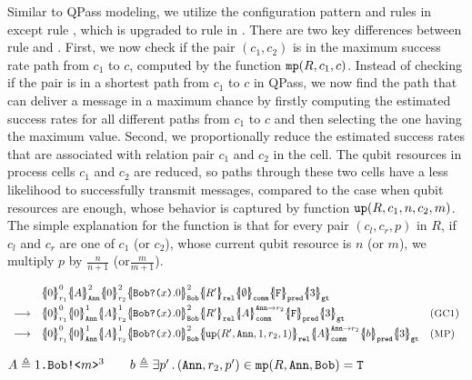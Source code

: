 Similar to QPass modeling, we utilize the configuration pattern and rules in  except rule ,
which is upgraded to rule  in .
There are two key differences between rule  and .
First, we now check if the pair $(c_1,c_2)$ is in the maximum success rate path from $c_1$ to $c$, computed by the function $\texttt{mp}(R,c_1,c)$. Instead of checking if the pair is in a shortest path from $c_1$ to $c$ in QPass, we now find the path that can deliver a message in a maximum chance by firstly computing the estimated success rates for all different paths from $c_1$ to $c$ and then selecting the one having the maximum value. Second, we proportionally reduce the estimated success rates that are associated with relation pair $c_1$ and $c_2$ in the  cell. The qubit resources in process cells $c_1$ and $c_2$ are reduced, so paths through these two cells have a less likelihood to successfully transmit messages, compared to the case when qubit resources are enough,
whose behavior is captured by function $\texttt{up}(R,c_1,n,c_2,m)$.
The simple explanation for the  function is that
for every pair $(c_l,c_r,p)$ in $R$, if $c_l$ and $c_r$ are one of $c_1$ (or $c_2$), whose current qubit resource is $n$ (or $m$), we multiply $p$ by $\frac{n}{n+1}$ (or$ \frac{m}{m+1}$). 

{\footnotesize
\begin{center}
\[
\begin{array}{lll}
&
\pcellb{0}{0}{r_1}
\pcellb{A}{2}{\cn{Ann}}
\pcellb{0}{2}{r_2}
\pcellb{\qrev{\cn{Bob}}{x}.0}{2}{\cn{Bob}}
\qcellb{R'}{\cn{rel}}
\qcellb{\emptyset}{\cn{comm}}
\qcellb{\cn{F}}{\cn{pred}}
\qcellb{3}{\cn{gt}}
\\[0.5em]
\longrightarrow
&
\pcellb{0}{0}{r_1}
\pcellb{0}{1}{\cn{Ann}}
\pcellb{A}{1}{r_2}
\pcellb{\qrev{\cn{Bob}}{x}.0}{2}{\cn{Bob}}
\qcellb{R'}{\cn{rel}}
\pcellb{A}{\cn{Ann}\rightarrow r_2}{\cn{comm}}
\qcellb{\cn{F}}{\cn{pred}}
\qcellb{3}{\cn{gt}}
&
(\rulelab{GC1})
\\[0.5em]
\longrightarrow
&
\pcellb{0}{0}{r_1}
\pcellb{0}{1}{\cn{Ann}}
\pcellb{A}{1}{r_2}
\pcellb{\qrev{\cn{Bob}}{x}.0}{2}{\cn{Bob}}
\qcellb{\cn{up}(R',\cn{Ann},1,r_2,1)}{\cn{rel}}
\pcellb{A}{\cn{Ann}\rightarrow r_2}{\cn{comm}}
\qcellb{b}{\cn{pred}}
\qcellb{3}{\cn{gt}}
&
(\rulelab{MP})
\end{array}
\]
\end{center}
}
{\footnotesize
\begin{center}
$A\triangleq1\texttt{.}\texttt{Bob}\texttt{!<}m\texttt{>}^3
\qquad
b\triangleq \exists p'\,.\,(\texttt{Ann},r_2,p')\in \texttt{mp}(R,\texttt{Ann},\texttt{Bob})=\texttt{T}
$
\end{center}
}

